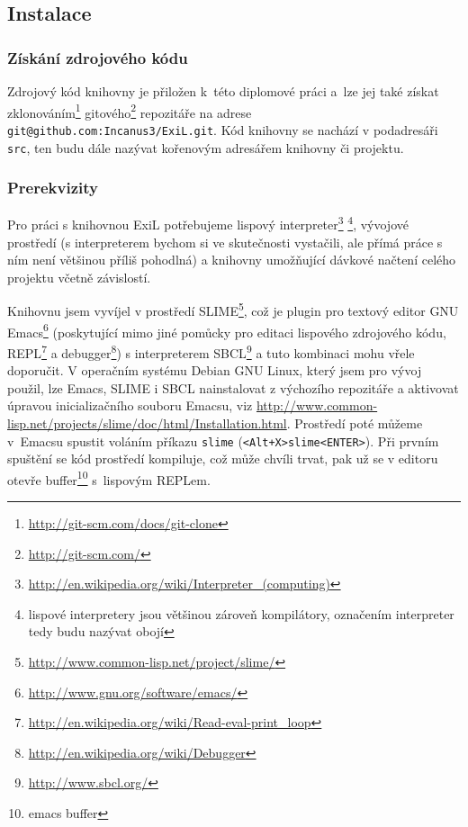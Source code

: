 \subsection{Instalace}
\subsubsection{Získání zdrojového kódu}
Zdrojový kód knihovny je přiložen k~této diplomové práci a~lze jej také získat
zklonováním\footnote{\url{http://git-scm.com/docs/git-clone}}
gitového\footnote{\url{http://git-scm.com/}} repozitáře na adrese
\verb|git@github.com:Incanus3/ExiL.git|.
Kód knihovny se nachází v podadresáři \verb|src|, ten budu dále nazývat kořenovým
adresářem knihovny či projektu.
\subsubsection{Prerekvizity}
Pro práci s knihovnou ExiL potřebujeme lispový
interpreter\footnote{\url{http://en.wikipedia.org/wiki/Interpreter_(computing)}}
\footnote{lispové interpretery jsou většinou zároveň
kompilátory\footnotemark[6], označením
interpreter tedy budu nazývat obojí},
vývojové prostředí (s interpreterem bychom si ve skutečnosti vystačili, ale
přímá práce s ním není většinou příliš pohodlná) a knihovny umožňující
dávkové načtení celého projektu včetně závislostí.

Knihovnu jsem vyvíjel v prostředí
SLIME\footnote{\url{http://www.common-lisp.net/project/slime/}}, což je plugin
pro textový editor GNU Emacs\footnote{\url{http://www.gnu.org/software/emacs/}}
(poskytující mimo jiné pomůcky pro editaci lispového zdrojového kódu,
REPL\footnote{\url{http://en.wikipedia.org/wiki/Read-eval-print_loop}} a
debugger\footnote{\url{http://en.wikipedia.org/wiki/Debugger}})
s interpreterem SBCL\footnote{\url{http://www.sbcl.org/}} a tuto kombinaci
mohu vřele doporučit. V operačním systému Debian GNU Linux, který jsem pro vývoj
použil, lze Emacs, SLIME i SBCL nainstalovat z výchozího repozitáře a aktivovat
úpravou inicializačního souboru Emacsu, viz
\url{http://www.common-lisp.net/projects/slime/doc/html/Installation.html}.
Prostředí poté můžeme v~Emacsu spustit voláním příkazu \verb|slime|
(\verb|<Alt+X>slime<ENTER>|). Při prvním spuštění se kód prostředí kompiluje, což
může chvíli trvat, pak už se v editoru otevře buffer\footnote{emacs buffer}
s~lispovým REPLem.

